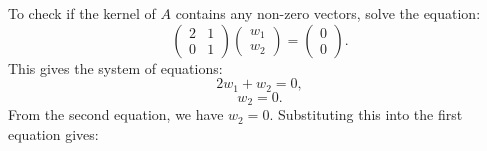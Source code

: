 \documentclass{report}
\begin{document}
\begin{itemize}
\begin{itemize}
                \bigbreak \noindent 
                To check if the kernel of \( A \) contains any non-zero vectors, solve the equation:
                \[
                    \begin{pmatrix} 2 & 1 \\ 0 & 1 \end{pmatrix} \begin{pmatrix} w_1 \\ w_2 \end{pmatrix} = \begin{pmatrix} 0 \\ 0 \end{pmatrix}.
                \]
                This gives the system of equations:
                \[
                    2w_1 + w_2 = 0,
                \]
                \[
                    w_2 = 0.
                \]
                From the second equation, we have \( w_2 = 0 \). Substituting this into the first equation gives:


\end{itemize}
\end{itemize}
\end{document}
